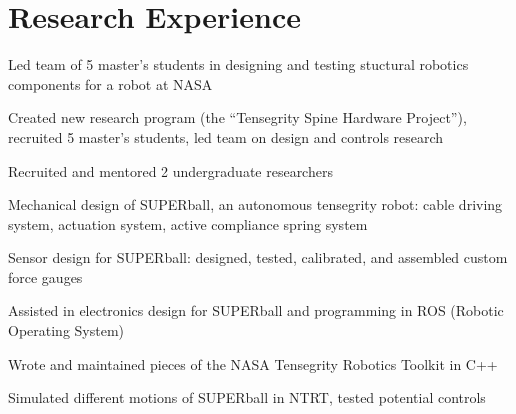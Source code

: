 \documentclass[letterpaper]{deedy-resume} %
\begin{document}
\newpage %

\begin{minipage}[t]{1\textwidth} %


\section{Research Experience}

\vspace{0.4cm}


\vspace{\topsep} %
\begin{tightitemize}
\item Led team of 5 master's students in designing and testing stuctural robotics components for a robot at NASA
\item Created new research program (the ``Tensegrity Spine Hardware Project''), recruited 5 master's students, led team on design and controls research
\item Recruited and mentored 2 undergraduate researchers
\end{tightitemize}

\sectionspace %



\begin{tightitemize}
\item Mechanical design of SUPERball, an autonomous tensegrity robot: cable driving system, actuation system, active compliance spring system
\item Sensor design for SUPERball: designed, tested, calibrated, and assembled custom force gauges
\item Assisted in electronics design for SUPERball and programming in ROS (Robotic Operating System)
\item Wrote and maintained pieces of the NASA Tensegrity Robotics Toolkit in C++
\item Simulated different motions of SUPERball in NTRT, tested potential controls
\end{tightitemize}


\end{minipage}
\end{document}
